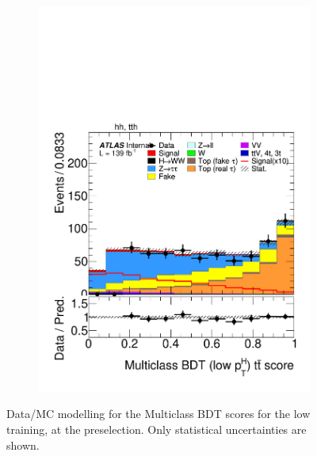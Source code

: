 \begin{figure}[!htbp]
\begin{subfigure}[b]{0.495\textwidth}
    \label{fig:plot_tth_Z_lowpt}
  \end{subfigure}%
  \hfill
  \begin{subfigure}[b]{0.495\textwidth}
    \centering
    \includegraphics[width=\linewidth]{images/plots_overtrain_lt200/plot_tth_ttbar_multiclass_lt200_hh_tth.pdf}

    \label{fig:plot_tth_ttbar_lowpt}
  \end{subfigure}
  
  \caption{Data/MC modelling for the Multiclass BDT scores for the low \pth training, at the \ttHtt preselection. Only statistical uncertainties are shown.}
  \label{lowpt_modelling}
\end{figure}


